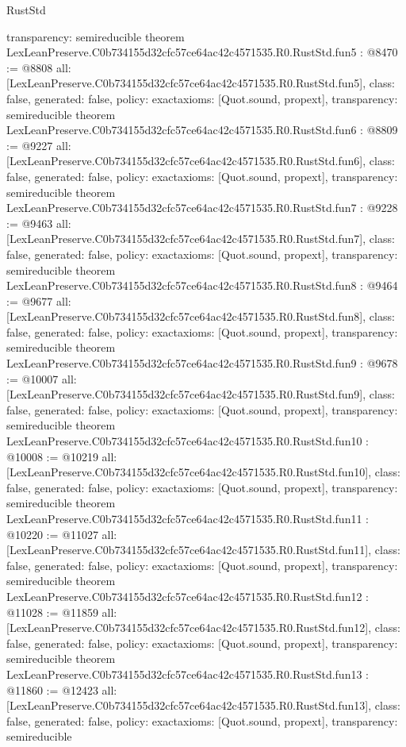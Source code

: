 \begin{lexlean}{RustStd}
\begin{coremodule}
{  transparency: semireducible
}
theorem LexLeanPreserve.C0b734155d32cfc57ce64ac42c4571535.R0.RustStd.fun5 : @8470 := @8808 {
  all: [LexLeanPreserve.C0b734155d32cfc57ce64ac42c4571535.R0.RustStd.fun5],
  class: false,
  generated: false,
  policy: exact{axioms: [Quot.sound, propext]},
  transparency: semireducible
}
theorem LexLeanPreserve.C0b734155d32cfc57ce64ac42c4571535.R0.RustStd.fun6 : @8809 := @9227 {
  all: [LexLeanPreserve.C0b734155d32cfc57ce64ac42c4571535.R0.RustStd.fun6],
  class: false,
  generated: false,
  policy: exact{axioms: [Quot.sound, propext]},
  transparency: semireducible
}
theorem LexLeanPreserve.C0b734155d32cfc57ce64ac42c4571535.R0.RustStd.fun7 : @9228 := @9463 {
  all: [LexLeanPreserve.C0b734155d32cfc57ce64ac42c4571535.R0.RustStd.fun7],
  class: false,
  generated: false,
  policy: exact{axioms: [Quot.sound, propext]},
  transparency: semireducible
}
theorem LexLeanPreserve.C0b734155d32cfc57ce64ac42c4571535.R0.RustStd.fun8 : @9464 := @9677 {
  all: [LexLeanPreserve.C0b734155d32cfc57ce64ac42c4571535.R0.RustStd.fun8],
  class: false,
  generated: false,
  policy: exact{axioms: [Quot.sound, propext]},
  transparency: semireducible
}
theorem LexLeanPreserve.C0b734155d32cfc57ce64ac42c4571535.R0.RustStd.fun9 : @9678 := @10007 {
  all: [LexLeanPreserve.C0b734155d32cfc57ce64ac42c4571535.R0.RustStd.fun9],
  class: false,
  generated: false,
  policy: exact{axioms: [Quot.sound, propext]},
  transparency: semireducible
}
theorem LexLeanPreserve.C0b734155d32cfc57ce64ac42c4571535.R0.RustStd.fun10 : @10008 := @10219 {
  all: [LexLeanPreserve.C0b734155d32cfc57ce64ac42c4571535.R0.RustStd.fun10],
  class: false,
  generated: false,
  policy: exact{axioms: [Quot.sound, propext]},
  transparency: semireducible
}
theorem LexLeanPreserve.C0b734155d32cfc57ce64ac42c4571535.R0.RustStd.fun11 : @10220 := @11027 {
  all: [LexLeanPreserve.C0b734155d32cfc57ce64ac42c4571535.R0.RustStd.fun11],
  class: false,
  generated: false,
  policy: exact{axioms: [Quot.sound, propext]},
  transparency: semireducible
}
theorem LexLeanPreserve.C0b734155d32cfc57ce64ac42c4571535.R0.RustStd.fun12 : @11028 := @11859 {
  all: [LexLeanPreserve.C0b734155d32cfc57ce64ac42c4571535.R0.RustStd.fun12],
  class: false,
  generated: false,
  policy: exact{axioms: [Quot.sound, propext]},
  transparency: semireducible
}
theorem LexLeanPreserve.C0b734155d32cfc57ce64ac42c4571535.R0.RustStd.fun13 : @11860 := @12423 {
  all: [LexLeanPreserve.C0b734155d32cfc57ce64ac42c4571535.R0.RustStd.fun13],
  class: false,
  generated: false,
  policy: exact{axioms: [Quot.sound, propext]},
  transparency: semireducible
}
\end{coremodule}
\end{lexlean}
